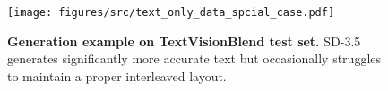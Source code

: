 \begin{figure}
    \centering
    \texttt{[image: figures/src/text\_only\_data\_spcial\_case.pdf]}
    \caption{
    \textbf{Generation example on TextVisionBlend test set.} SD-3.5 generates significantly more accurate text but occasionally struggles to maintain a proper interleaved layout.
    }
    \label{fig:special case}
\end{figure}